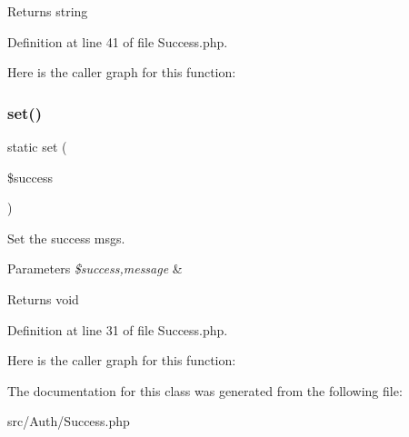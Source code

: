 \begin{DoxyReturn}{Returns}
string 
\end{DoxyReturn}


Definition at line 41 of file Success.\+php.

Here is the caller graph for this function\+:
\mbox{\label{class_zest_1_1_auth_1_1_success_ac81810b0f33b5e9d34a92bafd04fd85c}} 
\subsubsection{\texorpdfstring{set()}{set()}}
{\footnotesize\ttfamily static set (\begin{DoxyParamCaption}\item[{}]{\$success }\end{DoxyParamCaption})\hspace{0.3cm}{\ttfamily [static]}}

Set the success msgs.


\begin{DoxyParams}{Parameters}
{\em \$success,message} & \\
\hline
\end{DoxyParams}
\begin{DoxyReturn}{Returns}
void 
\end{DoxyReturn}


Definition at line 31 of file Success.\+php.

Here is the caller graph for this function\+:


The documentation for this class was generated from the following file\+:\begin{DoxyCompactItemize}
\item 
src/\+Auth/Success.\+php\end{DoxyCompactItemize}
